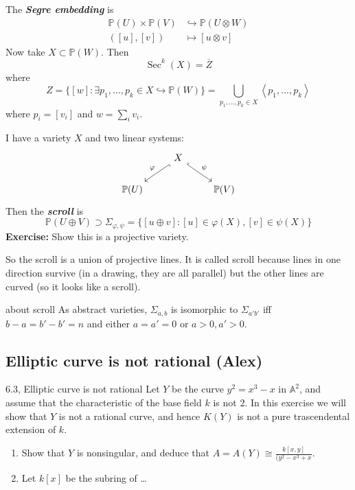 \begin{defn}
	The \textit{\textbf{Segre embedding }} is 
	 \begin{align*}
		 \mathbb{P}(U)\times \mathbb{P}(V)&\hookrightarrow \mathbb{P}(U\otimes W)  \\
		 ([u],[v]) &\longmapsto [u\otimes v]
	\end{align*}
	Now take $X\subset \mathbb{P}(W)$. Then
	\[\operatorname{Sec}^k(X)=\overline{Z}\]
	where
	\[Z=\{[w]:\exists p_1,\ldots,p_k\in X\hookrightarrow \mathbb{P}(W)\} =\bigcup_{p_1,\ldots,p_k\in X}\left<p_1,\ldots,p_k\right>  \]
	where $p_i=[v_i]$ and $w=\sum_{i}v_i$.
\end{defn}

\begin{defn}[Scroll]
	I have a variety $X$ and two linear systems:
	\[\begin{tikzcd}
	&X\arrow[dl,"\varphi",hook,swap]\arrow[dr,"\psi",hook]\\
	\mathbb{P}(U)&&\mathbb{P}(V)
	\end{tikzcd}\]
	Then the \textit{\textbf{scroll}} is
	\[\mathbb{P}(U\oplus V)\supset\Sigma_{\varphi,\psi}=\{[u\oplus v]:[u]\in\varphi(X),[v]\in\psi(X)\}\]
	\textbf{Exercise:} Show this is a projective variety.

	So the scroll is a union of projective lines. It is called scroll because lines in one direction survive (in a drawing, they are all parallel) but the other lines are curved (so it looks like a scroll).
\end{defn}

\begin{manualexercise}{about scroll}
	As abstract varieties, $\Sigma_{a,b}$ is isomorphic to $\Sigma_{a'b'}$ iff $b-a=b'-b'=n$ and either  $a=a'=0$ or  $a>0, a'>0$.
\end{manualexercise}

\subsection{Elliptic curve is not rational (Alex)}
\begin{manualexercise}{6.3, Elliptic curve is not rational}
	Let  $Y$ be the curve $y^2=x^3-x$ in $\mathbb{A}^2$, and assume that the characteristic of the base field $k$ is not 2. In this exercise we will show that $Y$ is not a rational curve, and hence $K(Y)$ is not a pure trascendental extension of $k$.
\begin{enumerate}[label=\alph*.]
	\item Show that $Y$ is nonsingular, and deduce that $A=A(Y)\cong \frac{k[x,y]}{(y^2-x^3+x}$.
	\item Let $k[x]$ be the subring of …
\end{enumerate}
\end{manualexercise}

